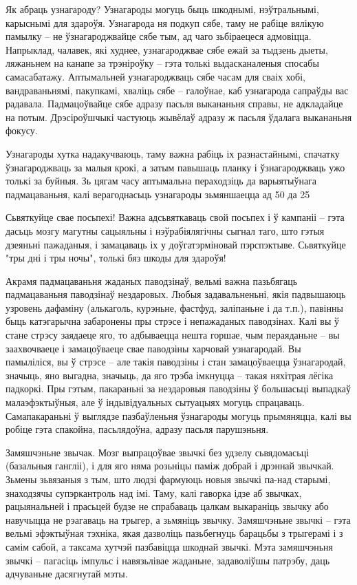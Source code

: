 Як абраць узнагароду? Узнагароды могуць быць шкоднымі, нэўтральнымі, карыснымі для здароўя. Узнагарода ня подкуп сябе, таму не рабіце вялікую памылку – не ўзнагароджвайце сябе тым, ад чаго зьбіраецеся адмовіцца. Напрыклад, чалавек, які худнее, узнагароджвае сябе ежай за тыдзень дыеты, ляжаньнем на канапе за трэніроўку – гэта толькі выдасканаленыя спосабы самасабатажу. Аптымальней узнагароджваць сябе часам для сваіх хобі, вандраваньнямі, пакупкамі, хваліць сябе – галоўнае, каб узнагарода сапраўды вас радавала. Падмацоўвайце сябе адразу пасьля выкананьня справы, не адкладайце на потым. Дрэсіроўшчыкі частуюць жывёлаў адразу ж пасьля ўдалага выкананьня фокусу.

Узнагароды хутка надакучваюць, таму важна рабіць іх разнастайнымі, спачатку ўзнагароджваць за малыя крокі, а затым павышаць планку і ўзнагароджваць ужо толькі за буйныя. Зь цягам часу аптымальна пераходзіць да варыятыўнага падмацаваньня, калі верагоднасьць узнагароды зьмяншаецца ад 50 да 25%

Сьвяткуйце свае посьпехі! Важна адсьвяткаваць свой посьпех і ў кампаніі – гэта дасьць мозгу магутны сацыяльны і нэўрабіялягічны сыгнал таго, што гэтыя дзеяньні пажаданыя, і замацаваць іх у доўгатэрміновай пэрспэктыве. Сьвяткуйце "тры дні і тры ночы", толькі бяз шкоды для здароўя!

Акрамя падмацаваньня жаданых паводзінаў, вельмі важна пазьбягаць падмацаваньня паводзінаў нездаровых. Любыя задавальненьні, якія падвышаюць узровень дафаміну (алькаголь, курэньне, фастфуд, заліпаньне і да т.п.), павінны быць катэгарычна забаронены пры стрэсе і непажаданых паводзінах. Калі вы ў стане стрэсу заядаеце яго, то адбываецца нешта горшае, чым пераяданьне – вы заахвочваеце і замацоўваеце свае паводзіны харчовай узнагародай. Вы памыліліся, вы ў стрэсе – але такія паводзіны і стан замацоўваецца ўзнагародай, значыць, яно выгадна, значыць, да яго трэба імкнуцца – такая няхітрая лёгіка падкоркі. Пры гэтым, пакараньні за нездаровыя паводзіны ў большасьці выпадкаў малаэфэктыўныя, але ў індывідуальных сытуацыях могуць спрацаваць. Самапакараньні ў выглядзе пазбаўленьня ўзнагароды могуць прымяняцца, калі вы робіце гэта спакойна, пасьлядоўна, адразу пасьля парушэньня.

Замяшчэньне звычак. Мозг выпрацоўвае звычкі без удзелу сьвядомасьці (базальныя гангліі), і для яго няма розьніцы паміж добрай і дрэннай звычкай. Зьмены зьвязаныя з тым, што людзі фармуюць новыя звычкі па-над старымі, знаходзячы супэркантроль над імі. Таму, калі гаворка ідзе аб звычках, рацыянальней і прасьцей будзе не спрабаваць цалкам выкараніць звычку або навучыцца не рэагаваць на трыгер, а зьмяніць звычку. Замяшчэньне звычкі – гэта вельмі эфэктыўная тэхніка, якая дазволіць пазьбегнуць барацьбы з трыгерамі і з самім сабой, а таксама хутчэй пазбавіцца шкоднай звычкі. Мэта замяшчэньня звычкі – пагасіць імпульс і навязьлівае жаданьне, задаволіўшы патрэбу, даць адчуваньне дасягнутай мэты.


